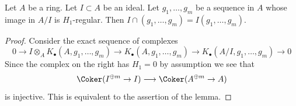 \begin{lemma}
\label{lemma-H1-regular-in-quotient}
Let $A$ be a ring. Let $I \subset A$ be an ideal.
Let $g_1, \ldots, g_m$ be a sequence in $A$ whose image in
$A/I$ is $H_1$-regular. Then $I \cap (g_1, \ldots, g_m) =
I(g_1, \ldots, g_m)$.
\end{lemma}

\begin{proof}
Consider the exact sequence of complexes
$$
0 \to I \otimes_A K_\bullet(A, g_1, \ldots, g_m)
\to K_\bullet(A, g_1, \ldots, g_m) \to
K_\bullet(A/I, g_1, \ldots, g_m) \to 0
$$
Since the complex on the right has $H_1 = 0$ by assumption we
see that
$$
\Coker(I^{\oplus m} \to I)
\longrightarrow
\Coker(A^{\oplus m} \to A)
$$
is injective. This is equivalent to the assertion of the lemma.
\end{proof}
